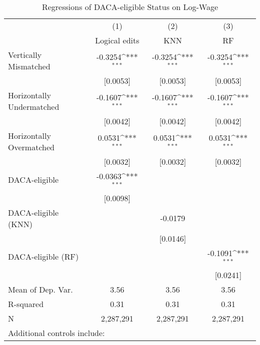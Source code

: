 \begin{table}[htbp]\centering
\def\sym#1{\ifmmode^{#1}\else\(^{#1}\)\fi}
\caption{Regressions of DACA-eligible Status on Log-Wage}
\begin{tabular}{l*{3}{c}}
\toprule
                    &\multicolumn{1}{c}{(1)}         &\multicolumn{1}{c}{(2)}         &\multicolumn{1}{c}{(3)}         \\
                    &Logical edits         &         KNN         &          RF         \\
\midrule
Vertically Mismatched&     -0.3254\sym{***}&     -0.3254\sym{***}&     -0.3254\sym{***}\\
                    &    [0.0053]         &    [0.0053]         &    [0.0053]         \\
\addlinespace
Horizontally Undermatched&     -0.1607\sym{***}&     -0.1607\sym{***}&     -0.1607\sym{***}\\
                    &    [0.0042]         &    [0.0042]         &    [0.0042]         \\
\addlinespace
Horizontally Overmatched&      0.0531\sym{***}&      0.0531\sym{***}&      0.0531\sym{***}\\
                    &    [0.0032]         &    [0.0032]         &    [0.0032]         \\
\addlinespace
DACA-eligible       &     -0.0363\sym{***}&                     &                     \\
                    &    [0.0098]         &                     &                     \\
\addlinespace
DACA-eligible (KNN) &                     &     -0.0179         &                     \\
                    &                     &    [0.0146]         &                     \\
\addlinespace
DACA-eligible (RF)  &                     &                     &     -0.1091\sym{***}\\
                    &                     &                     &    [0.0241]         \\
\midrule
Mean of Dep. Var.   &        3.56         &        3.56         &        3.56         \\
R-squared           &        0.31         &        0.31         &        0.31         \\
N                   &   2,287,291         &   2,287,291         &   2,287,291         \\
\bottomrule
\multicolumn{4}{l}{\footnotesize Additional controls include:}\\

\end{tabular}
\end{table}
